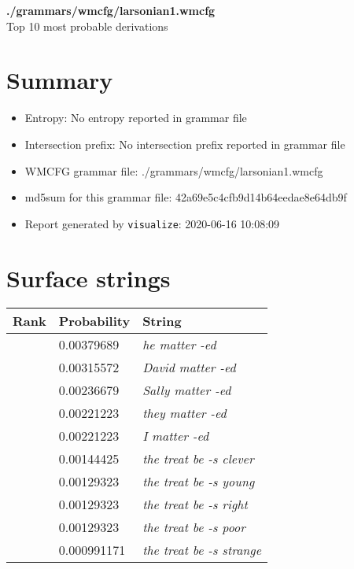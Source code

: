 \documentclass[11pt]{article}
\begin{document}
\begin{center}
{\huge \textbf{./grammars/wmcfg/larsonian1.wmcfg}} \\[0.5em]
{\normalsize Top 10 most probable derivations}
\end{center}

\section{Summary}
\begin{itemize}
	\item Entropy: No entropy reported in grammar file
	\item Intersection prefix: No intersection prefix reported in grammar file
	\item WMCFG grammar file: ./grammars/wmcfg/larsonian1.wmcfg
	\item md5sum for this grammar file: 42a69e5c4cfb9d14b64eedae8e64db9f
	\item Report generated by \texttt{visualize}: 2020-06-16 10:08:09
\end{itemize}

\section{Surface strings}
\hspace{1em}
\renewcommand{\arraystretch}{1.15}
\newcommand\rownumber{\stepcounter{rownumber}\arabic{rownumber}}
\begin{tabular}{l l l}
	\hline
	 Rank & Probability & String \\
	\hline
\rownumber & 0.00379689 & \textit{he matter -ed} \\
\rownumber & 0.00315572 & \textit{David matter -ed} \\
\rownumber & 0.00236679 & \textit{Sally matter -ed} \\
\rownumber & 0.00221223 & \textit{they matter -ed} \\
\rownumber & 0.00221223 & \textit{I matter -ed} \\
\rownumber & 0.00144425 & \textit{the treat be -s clever} \\
\rownumber & 0.00129323 & \textit{the treat be -s young} \\
\rownumber & 0.00129323 & \textit{the treat be -s right} \\
\rownumber & 0.00129323 & \textit{the treat be -s poor} \\
\rownumber & 0.000991171 & \textit{the treat be -s strange} \\
	\hline
\end{tabular}
\pagebreak
\end{document}
